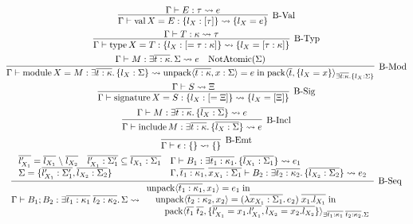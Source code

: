 \begin{gather*}
  \infer[\text{B-Val}]{\Gamma \vdash \symval X = E: \{l_X: [\tau]\} \elaborate \{l_X = e\}}{
    \Gamma \vdash E: \tau \elaborate e
  }
  \\
  \infer[\text{B-Typ}]{\Gamma \vdash \symtype X = T: \{l_X: [= \tau: \kappa]\} \elaborate \{l_X = [\tau: \kappa]\}}{
    \Gamma \vdash T: \kappa \elaborate \tau
  }
  \\
  \infer[\text{B-Mod}]{\Gamma \vdash \symmodule X = M: \exists \overline{t: \kappa}\ldotp \{l_X: \Sigma\} \elaborate \symunpack\langle \overline{t: \kappa}, x: \Sigma\rangle = e \symin \sympack\langle \overline{t}, \{l_X = x\}\rangle_{\exists \overline{t: \kappa}\ldotp \{l_X: \Sigma\}}}{
    \Gamma \vdash M: \exists \overline{t: \kappa}\ldotp \Sigma \elaborate e
    &
    \symNotAtomic(\Sigma)
  }
  \\
  \infer[\text{B-Sig}]{\Gamma \vdash \symsignature X = S: \{l_X: [= \Xi]\} \elaborate \{l_X = [\Xi]\}}{
    \Gamma \vdash S \elaborate \Xi
  }
  \\
  \infer[\text{B-Incl}]{\Gamma \vdash \syminclude M: \exists \overline{t: \kappa}\ldotp \{\overline{l_X: \Sigma}\} \elaborate e}{
    \Gamma \vdash M: \exists \overline{t: \kappa}\ldotp \{\overline{l_X: \Sigma}\} \elaborate e
  }
  \\
  \infer[\text{B-Emt}]{\Gamma \vdash \epsilon: \{\} \elaborate \{\}}{}
  \\
  \infer[\text{B-Seq}]{
    \Gamma \vdash B_1; B_2: \exists \overline{t_1: \kappa_1}\; \overline{t_2: \kappa_2}\ldotp \Sigma \elaborate
    \begin{array}{l}
      \symunpack\langle \overline{t_1: \kappa_1}, x_1\rangle = e_1 \symin \\
      \hspace{1em}\symunpack\langle \overline{t_2: \kappa_2}, x_2\rangle = (\lambda \overline{x_{X_1}: \Sigma_1}\ldotp e_2)\; \overline{x_1.l_{X_1}} \symin \\
      \hspace{2em}\sympack\langle \overline{t_1}\; \overline{t_2}, \{\overline{l'_{X_1} = x_1.l'_{X_1}}, \overline{l_{X_2} = x_2.l_{X_2}}\}\rangle_{
        \exists \overline{t_1: \kappa_1}\; \overline{t_2: \kappa_2}\ldotp \Sigma
      }
    \end{array}
  }{
    \begin{array}{lll}
      \overline{l'_{X_1}} = \overline{l_{X_1}} \rcomplement \overline{l_{X_2}}
      &
      \overline{l'_{X_1}: \Sigma'_1} \subseteq \overline{l_{X_1}: \Sigma_1}
      &
      \Gamma \vdash B_1: \exists \overline{t_1: \kappa_1}\ldotp \{\overline{l_{X_1}: \Sigma_1}\} \elaborate e_1
      \\
      \multicolumn{2}{l}{\Sigma = \{\overline{l'_{X_1}: \Sigma'_1}, \overline{l_{X_2}: \Sigma_2}\}}
      &
      \Gamma, \overline{t_1: \kappa_1}, \overline{x_{X_1}: \Sigma_1} \vdash B_2: \exists \overline{t_2: \kappa_2}\ldotp \{\overline{l_{X_2}: \Sigma_2}\} \elaborate e_2
    \end{array}
  }
\end{gather*}


